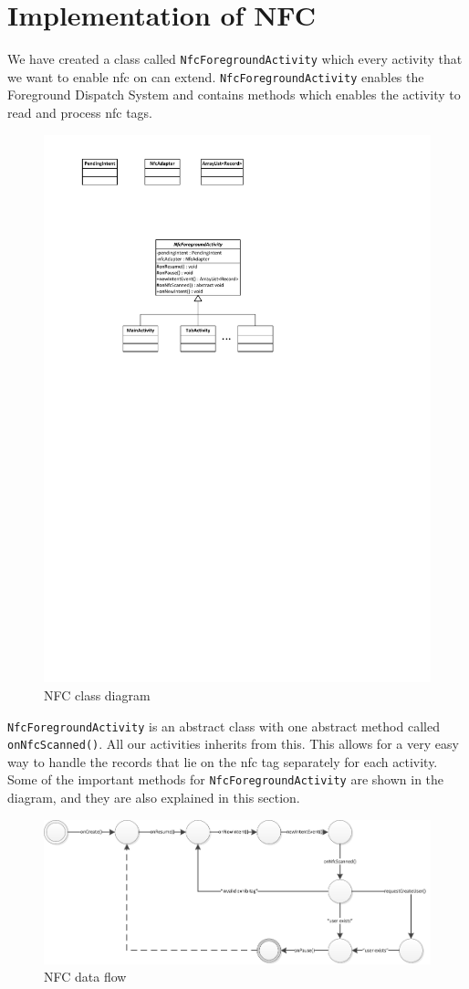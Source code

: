 \section{Implementation of NFC}
We have created a class called \lstinline|NfcForegroundActivity| which every activity that we want to enable \ac{nfc} on can extend. \lstinline|NfcForegroundActivity| enables the Foreground Dispatch System and contains methods which enables the activity to read and process \ac{nfc} tags.

\begin{figure}[H]
\centering
\includegraphics[width=0.55\linewidth, page=2]{img/nfcdiagram.pdf}
\caption{NFC class diagram}
\label{fig:nfcdiagram}
\end{figure}

\lstinline|NfcForegroundActivity| is an abstract class with one abstract method called \lstinline|onNfcScanned()|. All our activities inherits from this. This allows for a very easy way to handle the records that lie on the \ac{nfc} tag separately for each activity. Some of the important methods for \lstinline|NfcForegroundActivity| are shown in the diagram, and they are also explained in this section.

\begin{figure}[H]
\centering
\includegraphics[width=0.98\linewidth]{img/nfcdataflow.pdf}
\caption{NFC data flow}
\label{fig:nfcdataflow}
\end{figure}

